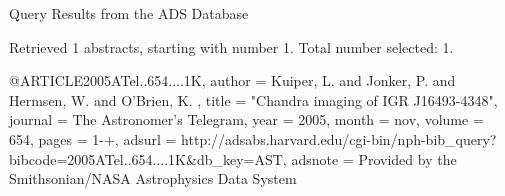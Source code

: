 Query Results from the ADS Database


Retrieved 1 abstracts, starting with number 1.  Total number selected: 1.

@ARTICLE{2005ATel..654....1K,
   author = {{Kuiper}, L. and {Jonker}, P. and {Hermsen}, W. and {O'Brien}, K.
	},
    title = "{Chandra imaging of IGR J16493-4348}",
  journal = {The Astronomer's Telegram},
     year = 2005,
    month = nov,
   volume = 654,
    pages = {1-+},
   adsurl = {http://adsabs.harvard.edu/cgi-bin/nph-bib_query?bibcode=2005ATel..654....1K&db_key=AST},
  adsnote = {Provided by the Smithsonian/NASA Astrophysics Data System}
}


